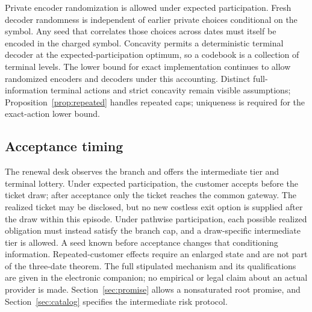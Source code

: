Private encoder randomization is allowed under expected participation. Fresh decoder randomness is independent of earlier private choices conditional on the symbol. Any seed that correlates those choices across dates must itself be encoded in the charged symbol. Concavity permits a deterministic terminal decoder at the expected-participation optimum, so a codebook is a collection of terminal levels. The lower bound for exact implementation continues to allow randomized encoders and decoders under this accounting. Distinct full-information terminal actions and strict concavity remain visible assumptions; Proposition~\ref{prop:repeated} handles repeated caps; uniqueness is required for the exact-action lower bound.


\subsection{Acceptance timing}
The renewal desk observes the branch and offers the intermediate tier and terminal lottery. Under expected participation, the customer accepts before the ticket draw; after acceptance only the ticket reaches the common gateway. The realized ticket may be disclosed, but no new costless exit option is supplied after the draw within this episode. Under pathwise participation, each possible realized obligation must instead satisfy the branch cap, and a draw-specific intermediate tier is allowed. A seed known before acceptance changes that conditioning information. Repeated-customer effects require an enlarged state and are not part of the three-date theorem. The full stipulated mechanism and its qualifications are given in the electronic companion; no empirical or legal claim about an actual provider is made. Section~\ref{sec:promise} allows a nonsaturated root promise, and Section~\ref{sec:catalog} specifies the intermediate risk protocol.
